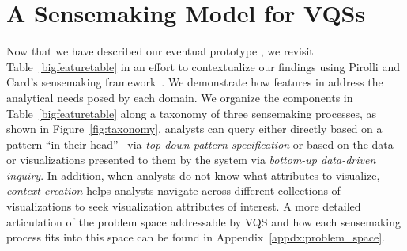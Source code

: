  \section{A Sensemaking Model for VQSs\label{sec:sensemaking}}
 Now that we have described our eventual prototype \zvpp, we revisit Table~\ref{bigfeaturetable} in an effort to contextualize our findings using Pirolli and Card's sensemaking framework~\cite{Pirolli}. We demonstrate how features in \zvpp address the analytical needs posed by each domain. We organize the components in Table~\ref{bigfeaturetable} along a taxonomy of three sensemaking processes, as shown in Figure~\ref{fig:taxonomy}. %
  analysts can query either directly based on a pattern ``in their head''~\cite{Sedlmair2012} via \emph{top-down pattern specification} or based on the data or visualizations presented to them by the system via \emph{bottom-up data-driven inquiry}. In addition, when analysts do not know what attributes to visualize, \emph{context creation} helps analysts navigate across different collections of visualizations to seek visualization attributes of interest. A more detailed articulation of the problem space addressable by VQS and how each sensemaking process fits into this space can be found in Appendix~\ref{appdx:problem_space}.
